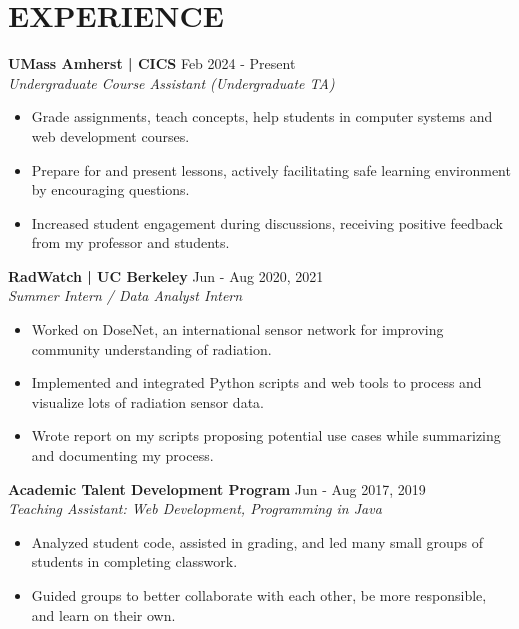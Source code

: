 \documentclass[letterpaper,10pt]{extarticle}
\begin{document}
\section*{EXPERIENCE}

\noindent
\textbf{UMass Amherst | CICS} \hfill Feb 2024 - Present \\
\textit{Undergraduate Course Assistant (Undergraduate TA)}
\begin{itemize}
    \item Grade assignments, teach concepts, help students in computer systems and web development courses.
    \item Prepare for and present lessons, actively facilitating safe learning environment by encouraging questions.
    \item Increased student engagement during discussions, receiving positive feedback from my professor and students.
\end{itemize}


\noindent
\textbf{RadWatch | UC Berkeley} \hfill Jun - Aug 2020, 2021 \\
\textit{Summer Intern / Data Analyst Intern}
\begin{itemize}
    \item Worked on DoseNet, an international sensor network for improving community understanding of radiation.
    \item Implemented and integrated Python scripts and web tools to process and visualize lots of radiation sensor data.
    \item Wrote report on my scripts proposing potential use cases while summarizing and documenting my process.
\end{itemize}

\noindent
\textbf{Academic Talent Development Program} \hfill Jun - Aug 2017, 2019\\ 
\textit{Teaching Assistant: Web Development, Programming in Java}
\begin{itemize}
    \item Analyzed student code, assisted in grading, and led many small groups of students in completing classwork.
    \item Guided groups to better collaborate with each other, be more responsible, and learn on their own.
\end{itemize}
\end{document}
